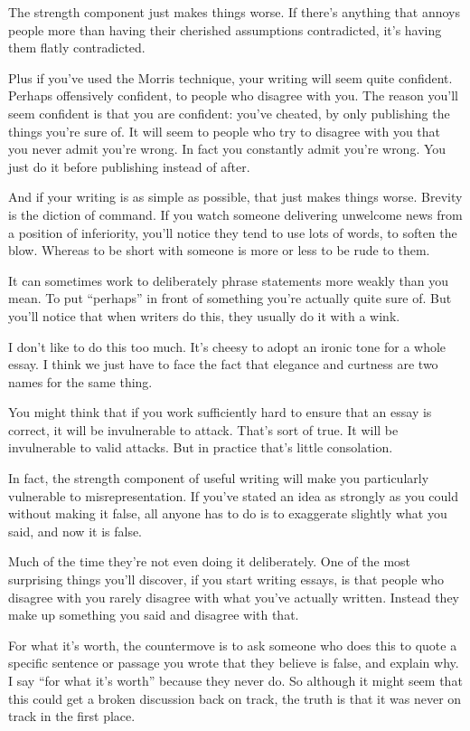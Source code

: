 \documentclass[12pt]{book}
\begin{document}
The strength component just makes things worse. If there's anything that
annoys people more than having their cherished assumptions contradicted,
it's having them flatly contradicted.

Plus if you've used the Morris technique, your writing will seem quite
confident. Perhaps offensively confident, to people who disagree with
you. The reason you'll seem confident is that you are confident: you've
cheated, by only publishing the things you're sure of. It will seem to
people who try to disagree with you that you never admit you're wrong.
In fact you constantly admit you're wrong. You just do it before
publishing instead of after.

And if your writing is as simple as possible, that just makes things
worse. Brevity is the diction of command. If you watch someone
delivering unwelcome news from a position of inferiority, you'll notice
they tend to use lots of words, to soften the blow. Whereas to be short
with someone is more or less to be rude to them.

It can sometimes work to deliberately phrase statements more weakly than
you mean. To put ``perhaps'' in front of something you're actually quite
sure of. But you'll notice that when writers do this, they usually do it
with a wink.

I don't like to do this too much. It's cheesy to adopt an ironic tone
for a whole essay. I think we just have to face the fact that elegance
and curtness are two names for the same thing.

You might think that if you work sufficiently hard to ensure that an
essay is correct, it will be invulnerable to attack. That's sort of
true. It will be invulnerable to valid attacks. But in practice that's
little consolation.

In fact, the strength component of useful writing will make you
particularly vulnerable to misrepresentation. If you've stated an idea
as strongly as you could without making it false, all anyone has to do
is to exaggerate slightly what you said, and now it is false.

Much of the time they're not even doing it deliberately. One of the most
surprising things you'll discover, if you start writing essays, is that
people who disagree with you rarely disagree with what you've actually
written. Instead they make up something you said and disagree with that.

For what it's worth, the countermove is to ask someone who does this to
quote a specific sentence or passage you wrote that they believe is
false, and explain why. I say ``for what it's worth'' because they never
do. So although it might seem that this could get a broken discussion
back on track, the truth is that it was never on track in the first
place.
\end{document}
